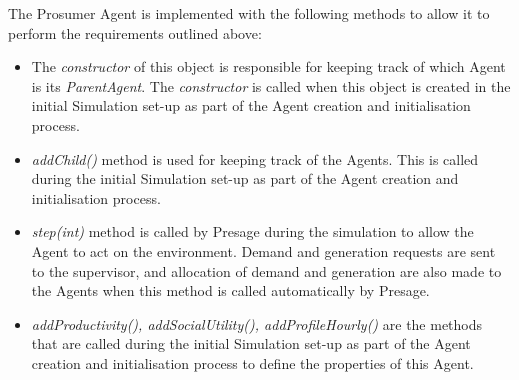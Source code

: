 The Prosumer Agent is implemented with the following methods to allow it to perform the requirements outlined above:
\begin{itemize}
	\item The \textit{constructor} of this object is responsible for keeping track of which Agent is its \textit{ParentAgent}. The \textit{constructor} is called when this object is created in the initial Simulation set-up as part of the Agent creation and initialisation process.
	\item \textit{addChild()} method is used for keeping track of the Agents. This is called during the initial Simulation set-up as part of the Agent creation and initialisation process.
	\item \textit{step(int)} method is called by Presage during the simulation to allow the Agent to act on the environment. Demand and generation requests are sent to the supervisor, and allocation of demand and generation are also made to the Agents when this method is called automatically by Presage.
	\item \textit{addProductivity(), addSocialUtility(), addProfileHourly()} are the methods that are called during the initial Simulation set-up as part of the Agent creation and initialisation process to define the properties of this Agent.
\end{itemize}



